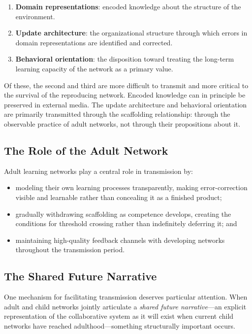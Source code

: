 \documentclass[11pt]{article}
\begin{document}
\begin{enumerate}
    \item \textbf{Domain representations}: encoded knowledge about the structure of the environment.
    \item \textbf{Update architecture}: the organizational structure through which errors in domain
          representations are identified and corrected.
    \item \textbf{Behavioral orientation}: the disposition toward treating the long-term learning
          capacity of the network as a primary value.
\end{enumerate}

Of these, the second and third are more difficult to transmit and more critical to the survival
of the reproducing network. Encoded knowledge can in principle be preserved in external media.
The update architecture and behavioral orientation are primarily transmitted through the
scaffolding relationship: through the observable practice of adult networks, not through
their propositions about it.

\subsection{The Role of the Adult Network}

Adult learning networks play a central role in transmission by:

\begin{itemize}
    \item modeling their own learning processes transparently, making error-correction visible
          and learnable rather than concealing it as a finished product;
    \item gradually withdrawing scaffolding as competence develops, creating the conditions for
          threshold crossing rather than indefinitely deferring it; and
    \item maintaining high-quality feedback channels with developing networks throughout the
          transmission period.
\end{itemize}

\subsection{The Shared Future Narrative}

One mechanism for facilitating transmission deserves particular attention. When adult and child
networks jointly articulate a \emph{shared future narrative}---an explicit representation of the
collaborative system as it will exist when current child networks have reached adulthood---something
structurally important occurs.
\end{document}
